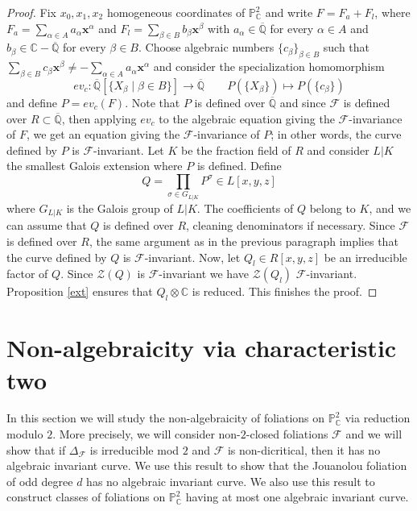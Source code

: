 \documentclass[reqno,oneside,11pt]{amsart}
\theoremstyle{definition}
\begin{document}
\begin{proof}  
    Fix $x_0, x_1, x_2$ homogeneous coordinates of $\mathbb{P}_{\mathbb{C}}^{2}$ and write $F=F_a+F_l$, where $F_a = \sum_{\alpha \in A} a_{\alpha}\textbf{x}^{\alpha}$ and $F_{l} = \sum_{\beta \in B} b_{\beta}\textbf{x}^{\beta}$ with $a_{\alpha}\in \overline{\mathbb{Q}}$ for every $\alpha \in A$ and $b_{\beta} \in \mathbb{C}-\overline{\mathbb{Q}}$ for every $\beta \in B$. Choose algebraic numbers $\{c_{\beta}\}_{\beta \in B}$ such that $\sum_{\beta \in B} c_{\beta}\textbf{x}^{\beta} \neq -\sum_{\alpha \in A}a_{\alpha}\textbf{x}^{\alpha}$ and consider the specialization homomorphism 
    $$
        ev_{c}\colon \overline{\mathbb{Q}}[\{X_{\beta}\mid \beta \in B\}] \longrightarrow \overline{\mathbb{Q}} \qquad P(\{X_{\beta}\})\mapsto P(\{c_{\beta}\})
    $$
    and define $P= ev_{c}(F)$. Note that $P$ is defined over $\overline{\mathbb{Q}}$ and since $\mathcal{F}$ is defined over $R \subset \overline{\mathbb{Q}}$, then applying $ev_c$ to the algebraic equation giving the $\mathcal{F}$-invariance of $F$, we get an equation giving the $\mathcal{F}$-invariance of $P$; in other words, the curve defined by $P$ is $\mathcal{F}$-invariant. Let $K$ be the fraction field of $R$ and consider $L|K$ the smallest Galois extension where $P$ is defined. Define
    $$
        Q = \prod_{\sigma \in G_{L|K}}P^{\sigma} \in L[x,y,z]
    $$
    where $G_{L|K}$ is the Galois group of $L|K$. The coefficients of $Q$ belong to $K$, and we can assume that $Q$ is defined over $R$, cleaning denominators if necessary. Since $\mathcal{F}$ is defined over $R$, the same argument as in the previous paragraph implies that the curve defined by $Q$ is $\mathcal{F}$-invariant.  Now, let $Q_{l} \in R[x,y,z]$ be an irreducible factor of $Q$. Since $\mathcal{Z}(Q) $ is $\mathcal{F}$-invariant we have $\mathcal{Z}(Q_l)$ $\mathcal{F}$-invariant. Proposition \ref{ext} ensures that $Q_{l}\otimes\mathbb{C}$ is reduced. This finishes the proof.
\end{proof}


\section{Non-algebraicity via characteristic two}\label{algtwo}

In this section we will study the non-algebraicity of foliations on $\mathbb{P}^2_{\mathbb{C}}$ via reduction modulo $2$. More precisely, we will consider non-$2$-closed foliations $\mathcal{F}$ and we will show that if $\Delta_\mathcal{F}$ is irreducible mod $2$ and $\mathcal{F}$ is non-dicritical, then it has no algebraic invariant curve. We use this result to show that the Jouanolou foliation of odd degree $d$ has no algebraic invariant curve. We also use this result to construct classes of foliations on $\mathbb{P}^2_\mathbb{C}$ having at most one algebraic invariant curve.
\end{document}

